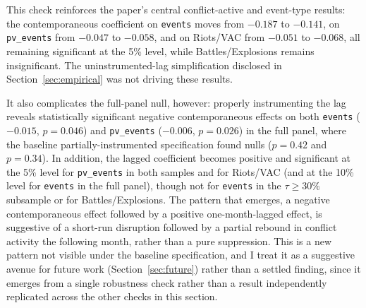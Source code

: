 \documentclass[12pt]{article}
\begin{document}
This check reinforces the paper's central conflict-active and event-type results: the contemporaneous coefficient on \texttt{events} moves from $-0.187$ to $-0.141$, on \texttt{pv\_events} from $-0.047$ to $-0.058$, and on Riots/VAC from $-0.051$ to $-0.068$, all remaining significant at the 5\% level, while Battles/Explosions remains insignificant. The uninstrumented-lag simplification disclosed in Section~\ref{sec:empirical} was not driving these results.

It also complicates the full-panel null, however: properly instrumenting the lag reveals statistically significant negative contemporaneous effects on both \texttt{events} ($-0.015$, $p=0.046$) and \texttt{pv\_events} ($-0.006$, $p=0.026$) in the full panel, where the baseline partially-instrumented specification found nulls ($p=0.42$ and $p=0.34$). In addition, the lagged coefficient becomes positive and significant at the 5\% level for \texttt{pv\_events} in both samples and for Riots/VAC (and at the 10\% level for \texttt{events} in the full panel), though not for \texttt{events} in the $\tau \geq 30\%$ subsample or for Battles/Explosions. The pattern that emerges, a negative contemporaneous effect followed by a positive one-month-lagged effect, is suggestive of a short-run disruption followed by a partial rebound in conflict activity the following month, rather than a pure suppression. This is a new pattern not visible under the baseline specification, and I treat it as a suggestive avenue for future work (Section~\ref{sec:future}) rather than a settled finding, since it emerges from a single robustness check rather than a result independently replicated across the other checks in this section.



\end{document}

